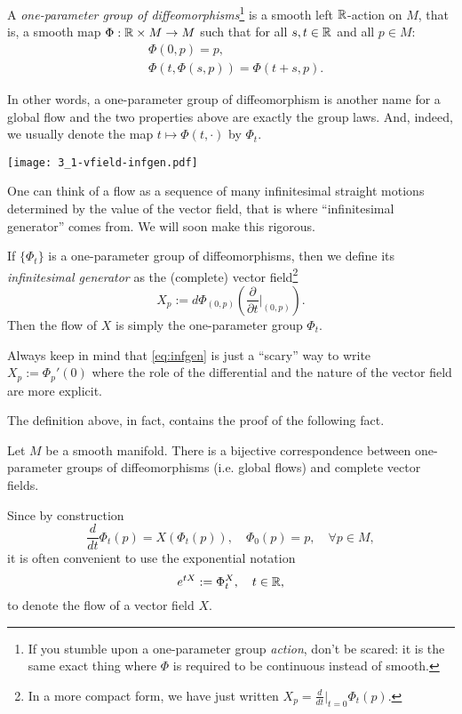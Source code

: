 \begin{definition}
  A \emph{one-parameter group of diffeomorphisms}\footnote{If you stumble upon a one-parameter group \emph{action}, don't be scared: it is the same exact thing where $\Phi$ is required to be continuous instead of smooth.} is a smooth left $\mathbb{R}$-action on $M$, that is, a smooth map $\Phi:\mathbb{R}\times M \to M$ such that for all $s,t\in\mathbb{R}$ and all $p\in M$:
  \begin{align}
    &\Phi(0,p) = p,\\
    &\Phi(t, \Phi(s, p)) = \Phi(t+s, p).
  \end{align}
  
  In other words, a one-parameter group of diffeomorphism is another name for a global flow and the two properties above are exactly the group laws.
  And, indeed, we usually denote the map $t\mapsto\Phi(t,\cdot)$ by $\Phi_t$.

  \begin{marginfigure}
    \texttt{[image: 3\_1-vfield-infgen.pdf]}
    \label{fig:3_1-vfield-infgen}
    \caption{One can think of a flow as a sequence of many infinitesimal straight motions determined by the value of the vector field, that is where ``infinitesimal generator'' comes from. We will soon make this rigorous.}
  \end{marginfigure}
  If $\{\Phi_t\}$ is a one-parameter group of diffeomorphisms, then we define its \emph{infinitesimal generator} as the (complete) vector field\footnote{In a more compact form, we have just written $X_p = \frac{d}{dt}|_{t=0}\Phi_t(p)$.}
  \begin{equation}\label{eq:infgen}
    X_p := d\Phi_{(0,p)}\left(\frac{\partial}{\partial t}\Big|_{(0,p)}\right).
  \end{equation}
  Then the flow of $X$ is simply the one-parameter group $\Phi_t$.

  Always keep in mind that \eqref{eq:infgen} is just a ``scary'' way to write $X_p := \Phi_p'(0)$ where the role of the differential and the nature of the vector field are more explicit.
\end{definition}

The definition above, in fact, contains the proof of the following fact.
\begin{proposition}
  Let $M$ be a smooth manifold. There is a bijective correspondence between one-parameter groups of diffeomorphisms (i.e. global flows) and complete vector fields.
\end{proposition}

\begin{notation}
  Since by construction
  \begin{equation}
    \frac{d}{d t}\Phi_t(p) = X(\Phi_t(p)), \quad
    \Phi_0(p) = p, \quad \forall p\in M,
  \end{equation}
  it is often convenient to use the exponential notation
  \begin{equation}
    e^{t X} := \Phi^X_t, \quad t\in\mathbb{R},
  \end{equation}
  to denote the flow of a vector field $X$.
\end{notation}

